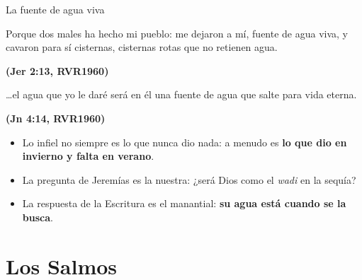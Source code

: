 \documentclass[hyperref={bookmarks=false},aspectratio=169]{beamer}
\newcommand{\fuente}[1]{\par\hfill{\upshape\bfseries\footnotesize\textcolor{azul}{#1}}}
\newcommand{\destacar}[1]{\textbf{\textcolor{azul}{#1}}}
\begin{document}
\begin{frame}{La fuente de agua viva}
\begin{cita}Porque dos males ha hecho mi pueblo: me dejaron a mí, fuente de agua viva, y cavaron para sí cisternas, cisternas rotas que no retienen agua.\fuente{(Jer 2:13, RVR1960)}\end{cita}
\begin{cita}\ldots{}el agua que yo le daré será en él una fuente de agua que salte para vida eterna.\fuente{(Jn 4:14, RVR1960)}\end{cita}
\small
\begin{itemize}
\item Lo infiel no siempre es lo que nunca dio nada: a menudo es \destacar{lo que dio en invierno y falta en verano}.
\item La pregunta de Jeremías es la nuestra: ¿será Dios como el \emph{wadi} en la sequía?
\item La respuesta de la Escritura es el manantial: \destacar{su agua está cuando se la busca}.
\end{itemize}
\end{frame}

\section{Los Salmos}
\end{document}
